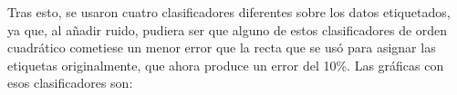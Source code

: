 \documentclass{article}
\begin{document}
Tras esto, se usaron cuatro clasificadores diferentes sobre los datos etiquetados, ya que, al añadir ruido, pudiera ser que alguno de estos clasificadores de orden cuadrático cometiese un menor error que la recta que se usó para asignar las etiquetas originalmente, que ahora produce un error del 10\%. Las gráficas con esos clasificadores son:

\begin{figure}[H]
  \centering
\end{figure}
\end{document}
